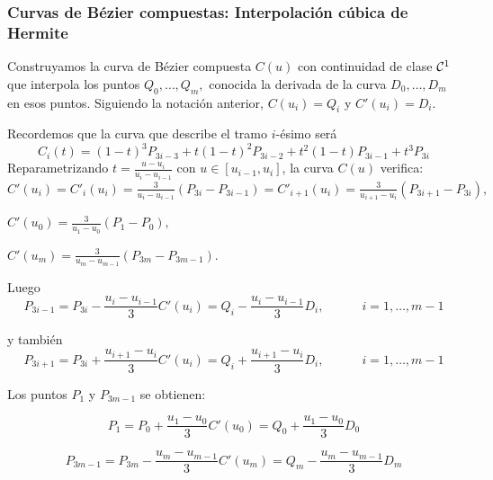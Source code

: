 \documentclass[twoside]{report}
\begin{document}
\subsubsection{Curvas de Bézier compuestas: Interpolación cúbica de Hermite}

Construyamos la curva de Bézier compuesta $C(u)$ con continuidad de clase ${\cal C}^1$ que interpola los puntos
$Q_0,\ldots,Q_m,$ conocida la derivada de la curva $D_0,\ldots,D_m$ en esos puntos. Siguiendo la notación anterior, $C(u_i)=Q_i$ y $C'(u_i)=D_i$.

\vspace{0.2cm}

Recordemos que la curva que describe el tramo $i$-ésimo será
$$C_i(t)=(1-t)^3P_{3i-3}+t(1-t)^2P_{3i-2}+t^2(1-t)P_{3i-1}+t^3P_{3i}$$
Reparametrizando $t=\frac{u-u_i}{u_i-u_{i-1}}$ con $u\in [u_{i-1},u_i]$, la curva $C(u)$ verifica: $C'(u_i)=C'_{i}(u_i)=\frac{3}{u_i-u_{i-1}}(P_{3i}-P_{3i-1})=C'_{i+1}(u_i)=\frac{3}{u_{i+1}-u_{i}}(P_{3i+1}-P_{3i}),$

\vspace{0.2cm}

$C'(u_0)=\frac{3}{u_1-u_0}(P_1-P_0),$

\vspace{0.2cm}
$C'(u_m)=\frac{3}{u_m-u_{m-1}}(P_{3m}-P_{3m-1})$.

\vspace{0.3cm}

Luego
$$P_{3i-1}=P_{3i}-\frac{u_i-u_{i-1}}{3} C'(u_i)=Q_i-\frac{u_i-u_{i-1}}{3} D_i, \quad \quad \quad i=1,\ldots,m-1$$

y también
$$P_{3i+1}=P_{3i}+\frac{u_{i+1}-u_{i}}{3} C'(u_i)=Q_i+\frac{u_{i+1}-u_{i}}{3} D_i, \quad \quad \quad i=1,\ldots,m-1$$

Los puntos $P_1$ y $P_{3m-1}$ se obtienen:

$$P_1=P_0+\frac{u_1-u_{0}}{3} C'(u_0)=Q_0+\frac{u_1-u_{0}}{3} D_0$$

$$P_{3m-1}=P_{3m}-\frac{u_m-u_{m-1}}{3} C'(u_m)=Q_m-\frac{u_m-u_{m-1}}{3} D_m$$

\vspace{0.3cm}
\end{document}
